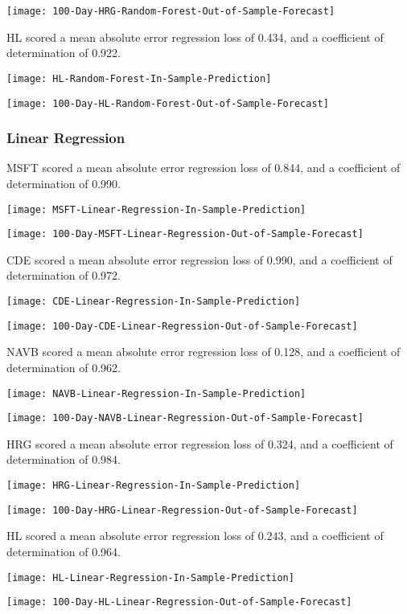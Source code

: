 \texttt{[image: 100-Day-HRG-Random-Forest-Out-of-Sample-Forecast]}

HL scored a mean absolute error regression loss of 0.434, and a coefficient of determination of 0.922.

\texttt{[image: HL-Random-Forest-In-Sample-Prediction]}

\texttt{[image: 100-Day-HL-Random-Forest-Out-of-Sample-Forecast]}

\subsubsection{Linear Regression}
MSFT scored a mean absolute error regression loss of 0.844, and a coefficient of determination of 0.990.

\texttt{[image: MSFT-Linear-Regression-In-Sample-Prediction]}

\texttt{[image: 100-Day-MSFT-Linear-Regression-Out-of-Sample-Forecast]}

CDE scored a mean absolute error regression loss of 0.990, and a coefficient of determination of 0.972.

\texttt{[image: CDE-Linear-Regression-In-Sample-Prediction]}

\texttt{[image: 100-Day-CDE-Linear-Regression-Out-of-Sample-Forecast]}

NAVB scored a mean absolute error regression loss of 0.128, and a coefficient of determination of 0.962.

\texttt{[image: NAVB-Linear-Regression-In-Sample-Prediction]}

\texttt{[image: 100-Day-NAVB-Linear-Regression-Out-of-Sample-Forecast]}

HRG scored a mean absolute error regression loss of 0.324, and a coefficient of determination of 0.984.

\texttt{[image: HRG-Linear-Regression-In-Sample-Prediction]}

\texttt{[image: 100-Day-HRG-Linear-Regression-Out-of-Sample-Forecast]}

HL scored a mean absolute error regression loss of 0.243, and a coefficient of determination of 0.964.

\texttt{[image: HL-Linear-Regression-In-Sample-Prediction]}

\texttt{[image: 100-Day-HL-Linear-Regression-Out-of-Sample-Forecast]}

